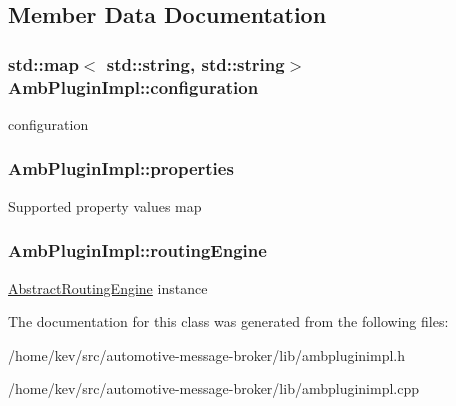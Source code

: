 \subsection{Member Data Documentation}
\hypertarget{classAmbPluginImpl_a1f711a42020b16453e6890d3634de987}{
\subsubsection[{configuration}]{\setlength{\rightskip}{0pt plus 5cm}std\+::map$<$ std\+::string, std\+::string$>$ Amb\+Plugin\+Impl\+::configuration\hspace{0.3cm}{\ttfamily [protected]}}}\label{classAmbPluginImpl_a1f711a42020b16453e6890d3634de987}
configuration \hypertarget{classAmbPluginImpl_a8f58d50cf0a4dd48b90e8fad6a9f5baa}{
\subsubsection[{properties}]{\setlength{\rightskip}{0pt plus 5cm}Amb\+Plugin\+Impl\+::properties\hspace{0.3cm}{\ttfamily [protected]}}}\label{classAmbPluginImpl_a8f58d50cf0a4dd48b90e8fad6a9f5baa}
Supported property values map \hypertarget{classAmbPluginImpl_a44be51306133b0d71ed79507032c3a8c}{
\subsubsection[{routing\+Engine}]{\setlength{\rightskip}{0pt plus 5cm}Amb\+Plugin\+Impl\+::routing\+Engine\hspace{0.3cm}{\ttfamily [protected]}}}\label{classAmbPluginImpl_a44be51306133b0d71ed79507032c3a8c}
\hyperlink{classAbstractRoutingEngine}{Abstract\+Routing\+Engine} instance 

The documentation for this class was generated from the following files\+:\begin{DoxyCompactItemize}
\item 
/home/kev/src/automotive-\/message-\/broker/lib/ambpluginimpl.\+h\item 
/home/kev/src/automotive-\/message-\/broker/lib/ambpluginimpl.\+cpp\end{DoxyCompactItemize}
